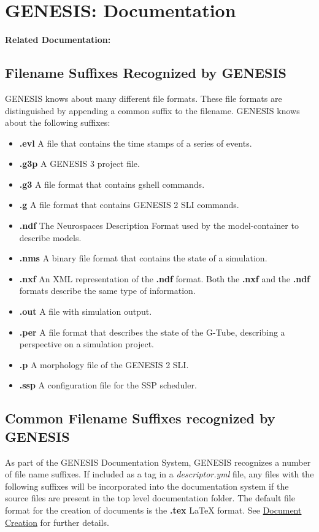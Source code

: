 \documentclass[12pt]{article}
\begin{document}
\section*{GENESIS: Documentation}

{\bf Related Documentation:}

\subsection*{Filename Suffixes Recognized by GENESIS}

GENESIS knows about many different file formats.  These file formats
are distinguished by appending a common suffix to the
filename.  GENESIS knows about the following suffixes:

\begin{itemize}

\item[]{\bf .evl} A file that contains the time stamps of a series of events.
\item[]{\bf .g3p} A GENESIS 3 project file.
\item[]{\bf .g3} A file format that contains gshell commands.
\item[]{\bf .g} A file format that contains GENESIS 2 SLI commands.
\item[]{\bf .ndf} The Neurospaces Description Format used by the model-container to describe models.
\item[]{\bf .nms} A binary file format that contains the state of a simulation.
\item[]{\bf .nxf} An XML representation of the {\bf .ndf} format.  Both the {\bf .nxf} and the {\bf .ndf} formats describe the same type of information.
\item[]{\bf .out} A file with simulation output.
\item[]{\bf .per} A file format that describes the state of the G-Tube, describing a perspective on a simulation project.
\item[]{\bf .p} A morphology file of the GENESIS 2 SLI.
\item[]{\bf .ssp} A configuration file for the SSP scheduler.

\end{itemize}

\subsection*{Common Filename Suffixes recognized by GENESIS}
As part of the GENESIS Documentation System, GENESIS recognizes a number of file name suffixes. If included as a tag in a {\it descriptor.yml} file, any files with the following suffixes will be incorporated into the documentation system if the source files are present in the top level documentation folder. The default file format for the creation of documents is the {\bf .tex} \LaTeX\,\,format. See \href{../document-create/document-create.tex}{Document Creation} for further details.
\end{document}
